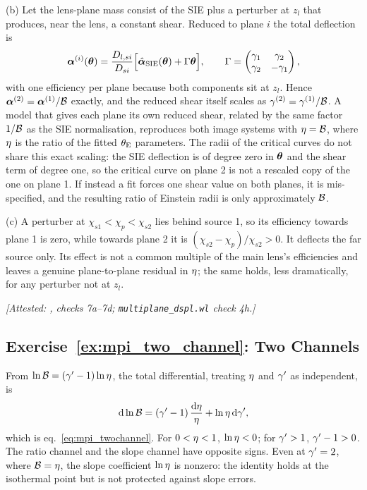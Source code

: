 (b) Let the lens-plane mass consist of the SIE plus a perturber
at $z_l$ that produces, near the lens, a constant shear.  Reduced to
plane $i$ the total deflection is
\begin{equation*}
  \boldsymbol{\alpha}^{(i)}(\boldsymbol{\theta})=\frac{D_{l,si}}{D_{si}}
  \Big[\hat{\boldsymbol{\alpha}}_{\rm SIE}(\boldsymbol{\theta})+\Gamma\boldsymbol{\theta}\Big],
  \qquad
  \Gamma=\begin{pmatrix}\gamma_1&\gamma_2\\ \gamma_2&-\gamma_1\end{pmatrix},
\end{equation*}
with one efficiency per plane because both components sit at $z_l$.
Hence $\boldsymbol{\alpha}^{(2)}=\boldsymbol{\alpha}^{(1)}/\mathcal{B}$ exactly, and the reduced
shear itself scales as $\gamma^{(2)}=\gamma^{(1)}/\mathcal{B}$.  A model that
gives each plane its own reduced shear, related by the same factor
$1/\mathcal{B}$ as the SIE normalisation, reproduces both image systems with
$\eta=\mathcal{B}$, where $\eta$ is the ratio of the fitted $\theta_{\mathrm{E}}$
parameters.  The radii of the critical curves do not share this exact
scaling: the SIE deflection is of degree zero in $\boldsymbol{\theta}$ and the
shear term of degree one, so the critical curve on plane 2 is not a
rescaled copy of the one on plane 1.  If instead a fit forces one shear value on both
planes, it is mis-specified, and the resulting ratio of Einstein radii
is only approximately $\mathcal{B}$.

(c) A perturber at $\chi_{s1}<\chi_p<\chi_{s2}$ lies behind
source 1, so its efficiency towards plane 1 is zero, while towards plane
2 it is $(\chi_{s2}-\chi_p)/\chi_{s2}>0$.  It deflects the far source
only.  Its effect is not a common multiple of the main lens's
efficiencies and leaves a genuine plane-to-plane residual in $\eta$;
the same holds, less dramatically, for any perturber not at $z_l$.

\emph{[Attested: ,
checks 7a--7d; \texttt{multiplane\_dspl.wl} check 4h.]}

\subsection*{Exercise~\ref{ex:mpi_two_channel}: Two Channels}

From $\ln\mathcal{B}=(\gamma'-1)\ln\eta$, the total differential, treating
$\eta$ and $\gamma'$ as independent, is
\begin{equation*}
  \dd\ln\mathcal{B}=(\gamma'-1)\,\frac{\dd\eta}{\eta}+\ln\eta\,\dd\gamma' ,
\end{equation*}
which is eq.~\eqref{eq:mpi_twochannel}.  For $0<\eta<1$,
$\ln\eta<0$; for $\gamma'>1$, $\gamma'-1>0$.  The ratio channel and the slope
channel have opposite signs.  Even at $\gamma'=2$, where $\mathcal{B}=\eta$, the
slope coefficient $\ln\eta$ is nonzero: the identity holds at the
isothermal point but is not protected against slope errors.

